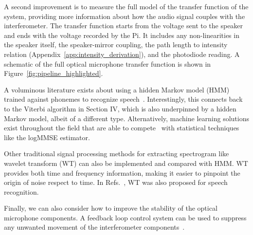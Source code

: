 \documentclass[paper-main.tex]{subfiles}
\begin{document}
A second improvement is to measure the full model of the transfer function of the system, providing more information about how the audio signal couples with the interferometer.
The transfer function starts from the voltage sent to the speaker and ends with the voltage recorded by the Pi. It includes any non-linearities in the speaker itself, the speaker-mirror coupling, the path length to intensity relation (Appendix~\ref{app:intensity_derivation}), and the photodiode reading. 
A schematic of the full optical microphone transfer function is shown in Figure~\ref{fig:pipeline_highlighted}.

A voluminous literature exists about using a hidden Markov model (HMM) trained against phonemes to recognize speech~\cite{HMM_english}. 
Interestingly, this connects back to the Viterbi algorithm in Section IV, which is also underpinned by a hidden Markov model, albeit of a different type. 
Alternatively, machine learning solutions exist throughout the field that are able to compete~\cite{SEGAN} with statistical techniques like the logMMSE estimator.

Other traditional signal processing methods for extracting spectrogram like wavelet transform (WT) \citep{nason1995stationary} can also be implemented and compared with HMM. WT provides both time and frequency information, making it easier to pinpoint the origin of noise respect to time. 
In Refs.~\cite{tufekci2000feature,agbinya1996discrete}, WT was also proposed for speech recognition. 

Finally, we can also consider how to improve the stability of the optical microphone components.
A feedback loop control system can be used to suppress any unwanted movement of the interferometer components~\citep{abbott2017exploring, Sekiguchi:2016bmv, verhoeven2009robust}. 

\end{document}

